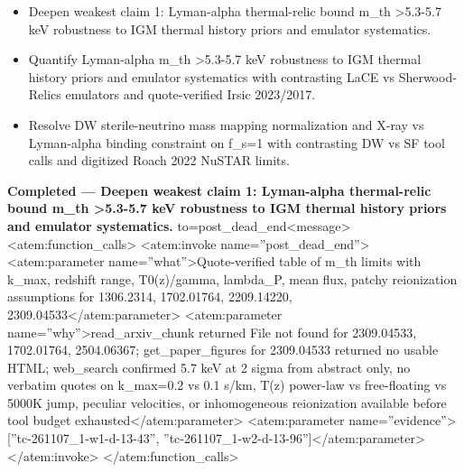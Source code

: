 \documentclass[11pt,a4paper]{article}
\begin{document}
\begin{itemize}
  \item Deepen weakest claim 1: Lyman-alpha thermal-relic bound m\_th \textgreater{}5.3-5.7 keV robustness to IGM thermal history priors and emulator systematics.
  \item Quantify Lyman-alpha m\_th \textgreater{}5.3-5.7 keV robustness to IGM thermal history priors and emulator systematics with contrasting LaCE vs Sherwood-Relics emulators and quote-verified Irsic 2023/2017.
  \item Resolve DW sterile-neutrino mass mapping normalization and X-ray vs Lyman-alpha binding constraint on f\_s=1 with contrasting DW vs SF tool calls and digitized Roach 2022 NuSTAR limits.
\end{itemize}
\textbf{Completed --- Deepen weakest claim 1: Lyman-alpha thermal-relic bound m\_th \textgreater{}5.3-5.7 keV robustness to IGM thermal history priors and emulator systematics.} to=post\_dead\_end\textless{}\textbar{}message\textbar{}\textgreater{}\textless{}atem:function\_calls\textgreater{} \textless{}atem:invoke name=''post\_dead\_end''\textgreater{} \textless{}atem:parameter name=''what''\textgreater{}Quote-verified table of m\_th limits with k\_max, redshift range, T0(z)/gamma, lambda\_P, mean flux, patchy reionization assumptions for 1306.2314, 1702.01764, 2209.14220, 2309.04533\textless{}/atem:parameter\textgreater{} \textless{}atem:parameter name=''why''\textgreater{}read\_arxiv\_chunk returned File not found for 2309.04533, 1702.01764, 2504.06367; get\_paper\_figures for 2309.04533 returned no usable HTML; web\_search confirmed 5.7 keV at 2 sigma from abstract only, no verbatim quotes on k\_max=0.2 vs 0.1 s/km, T(z) power-law vs free-floating vs 5000K jump, peculiar velocities, or inhomogeneous reionization available before tool budget exhausted\textless{}/atem:parameter\textgreater{} \textless{}atem:parameter name=''evidence''\textgreater{}[''tc-261107\_1-w1-d-13-43'', ''tc-261107\_1-w2-d-13-96'']\textless{}/atem:parameter\textgreater{} \textless{}/atem:invoke\textgreater{} \textless{}/atem:function\_calls\textgreater{}
\end{document}
